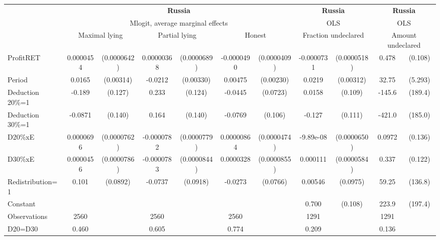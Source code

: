 \begin{tabular}{l|cccccc|cc|cc}
\hline\hline
&\multicolumn{6}{c|}{\bf Russia}&\multicolumn{2}{c|}{\bf Russia}&\multicolumn{2}{c}{\bf Russia}\\ &\multicolumn{6}{c|}{Mlogit, average marginal effects }&\multicolumn{2}{c|}{OLS}&\multicolumn{2}{c}{OLS}\\
                &\multicolumn{2}{c}{Maximal lying}&\multicolumn{2}{c}{Partial lying}&\multicolumn{2}{c}{Honest}  &\multicolumn{2}{c}{Fraction undeclared}&\multicolumn{2}{c}{Amount undeclared}\\
\hline
ProfitRET       &0.0000454         &(0.0000642)&0.00000368         &(0.0000689)&-0.0000490         &(0.0000409)&-0.0000731         &(0.0000518)&    0.478\sym{***}&  (0.108)\\
Period          &   0.0165\sym{***}&(0.00314)&  -0.0212\sym{***}&(0.00330)&  0.00475\sym{**} &(0.00230)&   0.0219\sym{***}&(0.00312)&    32.75\sym{***}&  (5.293)\\
Deduction 20\%=1&   -0.189         &  (0.127)&    0.233\sym{*}  &  (0.124)&  -0.0445         & (0.0723)&   0.0158         &  (0.109)&   -145.6         &  (189.4)\\
Deduction 30\%=1&  -0.0871         &  (0.140)&    0.164         &  (0.140)&  -0.0769         &  (0.106)&   -0.127         &  (0.111)&   -421.0\sym{**} &  (185.0)\\
D20\%xE         &0.0000696         &(0.0000762)&-0.0000782         &(0.0000779)&0.00000864         &(0.0000474)&-9.89e-08         &(0.0000650)&   0.0972         &  (0.136)\\
D30\%xE         &0.0000456         &(0.0000786)&-0.0000783         &(0.0000844)&0.0000328         &(0.0000855)& 0.000111\sym{*}  &(0.0000584)&    0.337\sym{***}&  (0.122)\\
Redistribution=1&    0.101         & (0.0892)&  -0.0737         & (0.0918)&  -0.0273         & (0.0766)&  0.00546         & (0.0975)&    59.25         &  (136.8)\\
Constant        &                  &         &                  &         &                  &         &    0.700\sym{***}&  (0.108)&    223.9         &  (197.4)\\
\hline
Observations    &     2560         &         &     2560         &         &     2560         &         &     1291         &         &     1291         &         \\
D20=D30         &    0.460         &         &    0.605         &         &    0.774         &         &    0.209         &         &    0.136         &         \\

\end{tabular}

